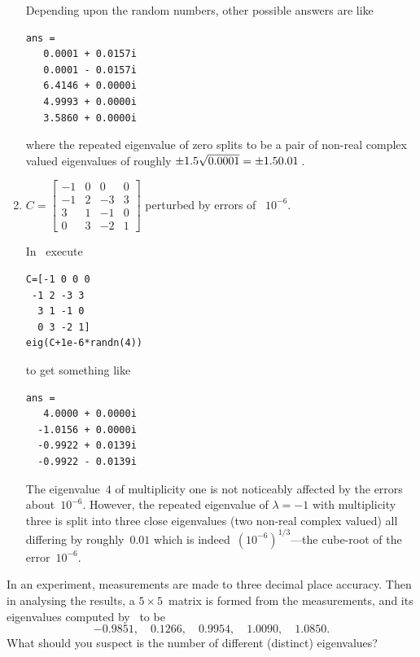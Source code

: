 \begin{example}
\begin{enumerate}
\begin{solution}
Depending upon the random numbers, other possible answers are like
\begin{verbatim}
ans =
   0.0001 + 0.0157i
   0.0001 - 0.0157i
   6.4146 + 0.0000i
   4.9993 + 0.0000i
   3.5860 + 0.0000i
\end{verbatim}
where the repeated eigenvalue of zero splits to be a pair of non-real complex valued eigenvalues of roughly \(\pm 1.5\sqrt{0.0001}=\pm 1.50.01\)\,.
\end{solution}



\item \(C=\begin{bmatrix}-1&0&0&0
\\-1&2&-3&3
\\3&1&-1&0
\\0&3&-2&1\end{bmatrix}\) perturbed by errors of ~\(10^{-6}\).
\begin{solution} 
In \script\ execute
\begin{verbatim}
C=[-1 0 0 0
 -1 2 -3 3
  3 1 -1 0
  0 3 -2 1]
eig(C+1e-6*randn(4))
\end{verbatim}
\setbox\ajrqrbox\hbox{}%
\marginajrbox%
to get something like
\begin{verbatim}
ans =
   4.0000 + 0.0000i
  -1.0156 + 0.0000i
  -0.9922 + 0.0139i
  -0.9922 - 0.0139i
\end{verbatim}
The eigenvalue~\(4\) of multiplicity one is not noticeably affected by the errors about~\(10^{-6}\).
However, the repeated eigenvalue of \(\lambda=-1\) with multiplicity three is split into three close eigenvalues (two non-real complex valued) all differing by roughly~\(0.01\) which is indeed~\((10^{-6})^{1/3}\)---the cube-root of the error~\(10^{-6}\).
\end{solution}

\end{enumerate}
\end{example}






\begin{activity}
In an experiment, measurements are made to three decimal place accuracy.
Then in analysing the results, a \(5\times5\)~matrix is formed from the measurements, and its eigenvalues computed by \script\ to be
\begin{equation*}
-0.9851,\quad
0.1266,\quad
0.9954,\quad
1.0090,\quad
1.0850.
\end{equation*}
What should you suspect is the number of different (distinct) eigenvalues?
\end{activity}








